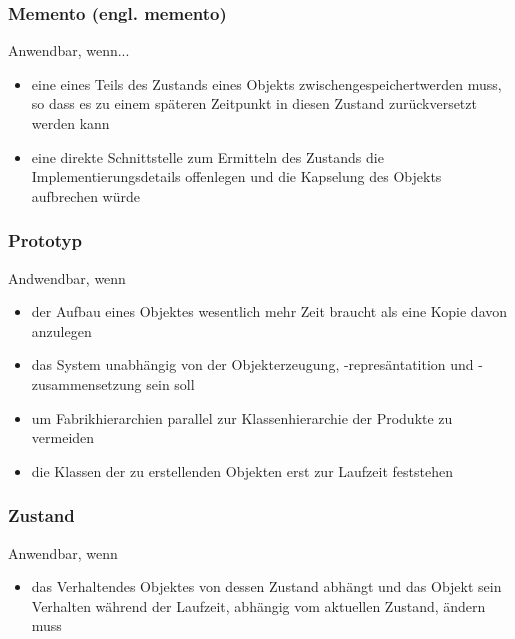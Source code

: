 \subsubsection{Memento (engl. memento)}
Anwendbar, wenn...
\begin{itemize}
    \item eine  eines Teils des Zustands eines Objekts zwischengespeichertwerden muss, so dass es zu einem späteren Zeitpunkt in diesen Zustand zurückversetzt werden kann
    \item eine direkte Schnittstelle zum Ermitteln des Zustands die Implementierungsdetails offenlegen und die Kapselung des Objekts aufbrechen würde
\end{itemize}

\subsubsection{Prototyp}
Andwendbar, wenn
\begin{itemize}
    \item der Aufbau eines Objektes wesentlich mehr Zeit braucht als eine Kopie davon anzulegen
    \item das System unabhängig von der Objekterzeugung, -represäntatition und -zusammensetzung sein soll
    \item um Fabrikhierarchien parallel zur Klassenhierarchie der Produkte zu vermeiden
    \item die Klassen der zu erstellenden Objekten erst zur Laufzeit feststehen
\end{itemize}


\subsubsection{Zustand}
Anwendbar, wenn
\begin{itemize}
    \item das Verhaltendes Objektes von dessen Zustand abhängt und das Objekt sein Verhalten während der Laufzeit, abhängig vom aktuellen Zustand, ändern muss
\end{itemize}

